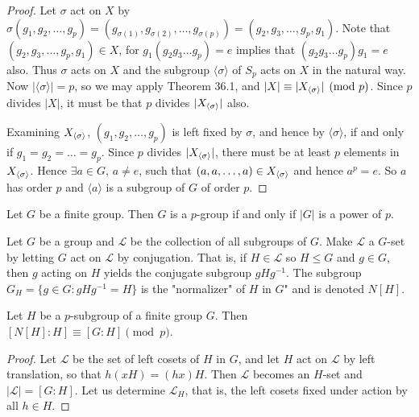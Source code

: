 \documentclass[a4paper,11pt]{article}
\newcommand{\lrangle}[1] {%
  \langle #1 \rangle%
}
\begin{document}
\begin{outline}
\begin{proof}
      Let \(\sigma\) act on \(X\) by \(\sigma(g_1, g_2, \ldots, g_p) =
      (g_{\sigma(1)}, g_{\sigma(2)}, \ldots, g_{\sigma(p)}) = (g_2, g_3, \ldots, g_p, g_1)\). Note that \((g_2, g_3, \ldots,
      g_p, g_1) \in X\), for \(g_1(g_2g_3\ldots g_p) = e\) implies that \((g_2g_3 \ldots g_p)g_1 = e\) also. Thus \(\sigma\)
      acts on \(X\) and the subgroup \(\lrangle{\sigma}\) of \(S_p\) acts on \(X\) in the natural way. Now 
      \(|\lrangle{\sigma}| = p\), so we may apply Theorem 36.1, and \(|X| \equiv |X_{\lrangle{\sigma}}| \pmod{p}\). Since
      \(p\) divides \(|X|\), it must be that \(p\) divides \(|X_{\lrangle{\sigma}}|\) also.
      
      Examining \(X_{\lrangle{\sigma}}\), \((g_1, g_2, \ldots, g_p)\) is left fixed by \(\sigma\), and hence by
      \(\lrangle{\sigma}\), if and only if \(g_1 = g_2 = \ldots = g_p\). Since \(p\) divides \(|X_{\lrangle{\sigma}}|\), 
      there must be at least \(p\) elements in \(X_{\lrangle{\sigma}}\). Hence \(\exists a \in G\), \(a \neq e\), such 
      that \((a, a, \ldots, a) \in X_{\lrangle{\sigma}}\) and hence \(a^p = e\). So \(a\) has order \(p\) and 
      \(\lrangle{a}\) is a subgroup of \(G\) of order \(p\).
    \end{proof}
      
    Let \(G\) be a finite group. Then \(G\) is a \(p\)-group if and only if \(|G|\) is a power of \(p\).
    
    Let \(G\) be a group and \(\mathcal{L}\) be the collection of all subgroups of \(G\). Make 
    \(\mathcal{L}\) a \(G\)-set by letting \(G\) act on \(\mathcal{L}\) by conjugation. That is, if 
    \(H \in \mathcal{L}\) so \(H \leq G\) and \(g \in G\), then \(g\) acting on \(H\) yields the conjugate 
    subgroup \(gHg^{-1}\). The subgroup \(G_H = \{g \in G : gHg^{-1} = H\}\) is the "normalizer" of \(H\) 
    in \(G\)" and is denoted \(N[H]\).
      
    Let \(H\) be a \(p\)-subgroup of a finite group \(G\). Then \([N[H]:H] \equiv [G:H] \pmod{p}\).
    
    \begin{proof}
      Let \(\mathcal{L}\) be the set of left cosets of \(H\) in \(G\), and let \(H\) act on \(\mathcal{L}\) by left
      translation, so that \(h(xH) = (hx)H\). Then \(\mathcal{L}\) becomes an \(H\)-set and \(|\mathcal{L}| = [G:H]\).
      Let us determine \(\mathcal{L}_H\), that is, the left cosets fixed under action by all \(h \in H\). 
      

\end{proof}
\end{outline}
\end{document}
